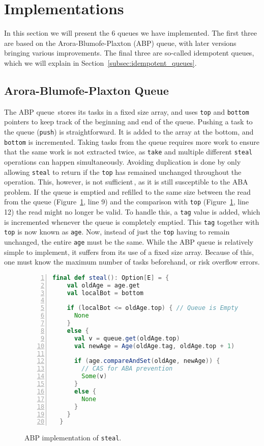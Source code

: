 \section{Implementations}
\label{sec:implementations}
In this section we will present the 6 queues we have implemented.
The first three are based on the Arora-Blumofe-Plaxton (ABP) queue, with later versions bringing various improvements.
The final three are so-called idempotent queues, which we will explain in Section~\ref{subsec:idempotent_queues}.

\subsection{Arora-Blumofe-Plaxton Queue}
The ABP queue\,\cite{Arora:1998:TSM:277651.277678} stores its tasks in a fixed size array, and uses \texttt{top} and \texttt{bottom} pointers to keep track of the beginning and end of the queue.
Pushing a task to the queue (\texttt{push}) is straightforward.
It is added to the array at the bottom, and \texttt{bottom} is incremented.
Taking tasks from the queue requires more work to ensure that the same work is not extracted twice, as \texttt{take} and multiple different \texttt{steal} operations can happen simultaneously.
Avoiding duplication is done by only allowing \texttt{steal} to return if the \texttt{top} has remained unchanged throughout the operation. 
This, however, is not sufficient\,\cite{Arora:1998:TSM:277651.277678}, as it is still susceptible to the ABA problem.
If the queue is emptied and refilled to the same size between the read from the queue (Figure~\ref{fig:abpsteal}, line 9) and the comparison with \texttt{top} (Figure~\ref{fig:abpsteal}, line 12) the read might no longer be valid.
To handle this, a \texttt{tag} value is added, which is incremented whenever the queue is completely emptied.
This \texttt{tag} together with \texttt{top} is now known as \texttt{age}.
Now, instead of just the \texttt{top} having to remain unchanged, the entire \texttt{age} must be the same.
While the ABP queue is relatively simple to implement, it suffers from its use of a fixed size array.
Because of this, one must know the maximum number of tasks beforehand, or risk overflow errors.

\begin{figure}
\begin{lstlisting}[language=scala,basicstyle=\ttfamily\bfseries\scriptsize,numbers=left]
final def steal(): Option[E] = {
    val oldAge = age.get
    val localBot = bottom

    if (localBot <= oldAge.top) { // Queue is Empty
      None
    }
    else {
      val v = queue.get(oldAge.top)
      val newAge = Age(oldAge.tag, oldAge.top + 1)

      if (age.compareAndSet(oldAge, newAge)) { 
      	// CAS for ABA prevention
        Some(v)
      }
      else {
        None
      }
    }
  }
\end{lstlisting}
\caption{ABP implementation of \texttt{steal}.}
\label{fig:abpsteal}
\end{figure}

